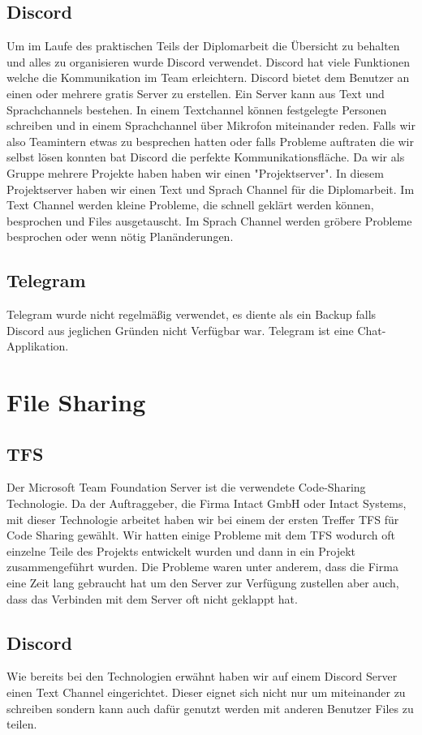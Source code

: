 \subsection {Discord}
\label{sec:Discord}
Um im Laufe des praktischen Teils der Diplomarbeit die Übersicht zu behalten und alles zu organisieren wurde Discord verwendet. Discord hat viele Funktionen welche die Kommunikation im Team erleichtern. Discord bietet dem Benutzer an einen oder mehrere gratis Server zu erstellen. Ein Server kann aus Text und Sprachchannels bestehen. In einem Textchannel können festgelegte Personen schreiben und in einem Sprachchannel über Mikrofon miteinander reden. Falls wir also Teamintern etwas zu besprechen hatten oder falls Probleme auftraten die wir selbst lösen konnten bat Discord die perfekte Kommunikationsfläche. 
Da wir als Gruppe mehrere Projekte haben haben wir einen "Projektserver". In diesem Projektserver haben wir einen Text und Sprach Channel für die Diplomarbeit. Im Text Channel werden kleine Probleme, die schnell geklärt werden können, besprochen und Files ausgetauscht. Im Sprach Channel werden gröbere Probleme besprochen oder wenn nötig Planänderungen. 
\subsection {Telegram}
\label{sec:Telegram}
Telegram wurde nicht regelmäßig verwendet, es diente als ein Backup falls Discord aus jeglichen Gründen nicht Verfügbar war. Telegram ist eine Chat-Applikation. 
\section{File Sharing}
\label{sec:FileSharing}
\subsection {TFS}
\label{sec:TFS}
Der Microsoft Team Foundation Server ist die verwendete Code-Sharing Technologie. Da der Auftraggeber, die Firma Intact GmbH oder Intact Systems, mit dieser Technologie arbeitet haben wir bei einem der ersten Treffer TFS für Code Sharing gewählt. Wir hatten einige Probleme mit dem TFS wodurch oft einzelne Teile des Projekts entwickelt wurden und dann in ein Projekt zusammengeführt wurden. Die Probleme waren unter anderem, dass die Firma eine Zeit lang gebraucht hat um den Server zur Verfügung zustellen aber auch, dass das Verbinden mit dem Server oft nicht geklappt hat. 
\subsection {Discord}
\label{sec:Discord}
Wie bereits bei den Technologien erwähnt haben wir auf einem Discord Server einen Text Channel eingerichtet. Dieser eignet sich nicht nur um miteinander zu schreiben sondern kann auch dafür genutzt werden mit anderen Benutzer Files zu teilen. 

